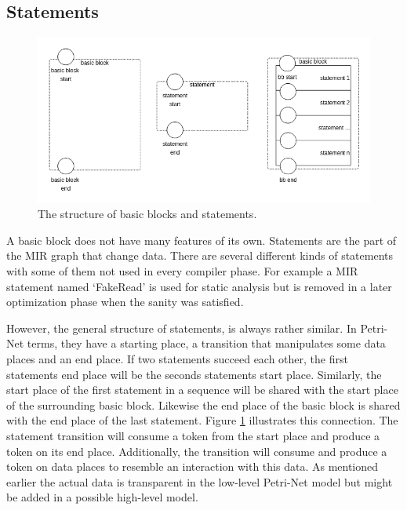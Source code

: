 \subsection{Statements}
\begin{figure}
    \centering
    \includegraphics[width=.9\textwidth]{../diagrams/basic_blocks.png}
    \caption{
        The structure of basic blocks and statements.
    }
    \label{basic_block_trans}
\end{figure}
A basic block does not have many features of its own.
Statements are the part of the MIR graph that change data.
There are several different kinds of statements with some of them not used in every compiler phase.
For example a MIR statement named `FakeRead' is used for static analysis but is removed in a later optimization phase when the sanity was satisfied.

However, the general structure of statements, is always rather similar.
In Petri-Net terms, they have a starting place, a transition that manipulates some data places and an end place.
If two statements succeed each other, the first statements end place will be the seconds statements start place.
Similarly, the start place of the first statement in a sequence will be shared with the start place of the surrounding basic block.
Likewise the end place of the basic block is shared with the end place of the last statement.
Figure \ref{basic_block_trans} illustrates this connection.
The statement transition will consume a token from the start place and produce a token on its end place.
Additionally, the transition will consume and produce a token on data places to resemble an interaction with this data.
As mentioned earlier the actual data is transparent in the low-level Petri-Net model but might be added in a possible high-level model.

